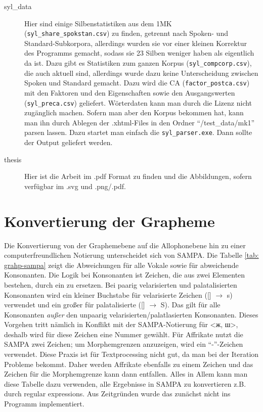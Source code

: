 \documentclass[12pt,headsepline,a4paper]{scrartcl}
\newcommand\textcyr[1]{{\fontencoding{OT2}\fontfamily{wncyr}\selectfont #1}}
\begin{document}
\begin{description}
\begin{itemize}
\end{itemize}
\item[syl\_data] Hier sind einige Silbenstatistiken aus dem 1MK (\texttt{syl\_share\_spokstan.csv}) zu finden, getrennt nach Spoken- und Standard-Subkorpora, allerdings wurden sie vor einer kleinen Korrektur des Programms gemacht, sodass sie 23 Silben weniger haben als eigentlich da ist. Dazu gibt es Statistiken zum ganzen Korpus (\texttt{syl\_compcorp.csv}), die auch aktuell sind, allerdings wurde dazu keine Unterscheidung zwischen Spoken und Standard gemacht. Dazu wird die CA (\texttt{factor\_postca.csv}) mit den Faktoren und den Eigenschaften sowie den Ausgangswerten (\texttt{syl\_preca.csv}) geliefert. Wörterdaten kann man durch die Lizenz nicht zugänglich machen. Sofern man aber den Korpus bekommen hat, kann man ihn durch Ablegen der .xhtml-Files in den Ordner "`/test\_data/mk1"' parsen lassen. Dazu startet man einfach die \texttt{syl\_parser.exe}. Dann sollte der Output geliefert werden.
\item[thesis] Hier ist die Arbeit im .pdf Format zu finden und die Abbildungen, sofern verfügbar im .svg und .png/.pdf.
\end{description}

\newpage

\section{Konvertierung der Grapheme}
\label{sec:conv_graph}
Die Konvertierung von der Graphemebene auf die Allophonebene hin zu einer computerfreundlichen Notierung unterscheidet sich von SAMPA. Die Tabelle \ref{tab: grahp-sampa} zeigt die Abweichungen für alle Vokale sowie für abweichende Konsonanten. Die Logik bei Konsonanten ist Zeichen, die aus zwei Elementen bestehen, durch ein zu ersetzen. Bei paarig velarisierten und palatalisierten Konsonanten wird ein kleiner Buchstabe für velarisierte Zeichen ([] $\to$ s) verwendet und ein großer für palatalisierte ([] $\to$ S). Das gilt für alle Konsonanten \textit{außer} den unpaarig velarisierten/palatlasierten Konsonanten. Dieses Vorgehen tritt nämlich in Konflikt mit der SAMPA-Notierung für <\textcyr{ж, ш}>, deshalb wird für diese Zeichen eine Nummer gewählt. Für Affrikate nutzt die SAMPA zwei Zeichen; um Morphemgrenzen anzuzeigen, wird ein "`-"'-Zeichen verwendet. Diese Praxis ist für Textprocessing nicht gut, da man bei der Iteration Probleme bekommt. Daher werden Affrikate ebenfalls zu einem Zeichen und das Zeichen für die Morphemgrenze kann dann entfallen. Alles in Allem kann man diese Tabelle dazu verwenden, alle Ergebnisse in SAMPA zu konvertieren z.B. durch regular expressions. Aus Zeitgründen wurde das zunächst nicht ins Programm implementiert.
\end{document}
